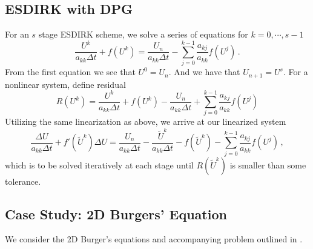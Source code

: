 \documentclass[Proposal.tex]{subfiles}
\begin{document}
\subsection{ESDIRK with DPG}
For an $s$ stage ESDIRK scheme, we solve a series of equations for $k=0,\cdots,s-1$
\begin{equation*}
\frac{U^k}{a_{kk}\Delta t}+f(U^k)=\frac{U_n}{a_{kk}\Delta
t}-\sum_{j=0}^{k-1}\frac{a_{kj}}{a_{kk}}f(U^j)\,.
\end{equation*}
From the first equation we see that $U^0=U_n$. And we have that $U_{n+1}=U^s$.
For a nonlinear system, define residual
\[
R(U^k) =
\frac{U^k}{a_{kk}\Delta t}+f(U^k)-\frac{U_n}{a_{kk}\Delta
t}+\sum_{j=0}^{k-1}\frac{a_{kj}}{a_{kk}}f(U^j)
\]
Utilizing the same linearization as above, we arrive at our linearized system
\[
\frac{\Delta U}{a_{kk}\Delta t}+f'(\tilde U^k)\Delta U
=\frac{U_n}{a_{kk}\Delta t}-\frac{\tilde U^k}{a_{kk}\Delta t}-f(\tilde U^k)
-\sum_{j=0}^{k-1}\frac{a_{kj}}{a_{kk}}f(U^j)\,,
\]
which is to be solved iteratively at each stage until $R(\tilde U^k)$ is smaller than some tolerance.

\subsection{Case Study: 2D Burgers' Equation}
We consider the 2D Burger's equations and accompanying problem outlined in \cite{Burgers2D}.
\end{document}
